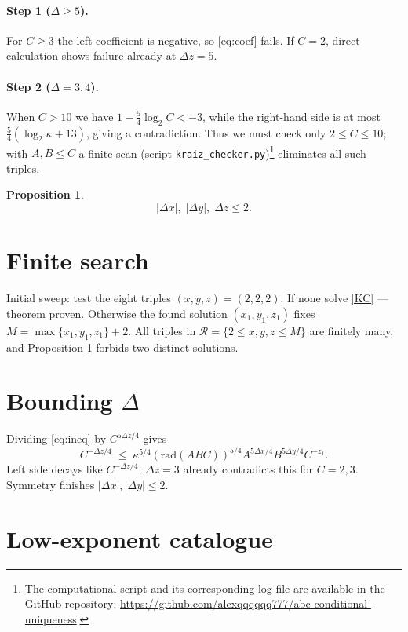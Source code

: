 \documentclass{article}
\newcommand{\rad}{\mathrm{rad}}
\newtheorem{proposition}[theorem]{Proposition}
\begin{document}
\paragraph{Step 1 ($\Delta\ge5$).} For $C\ge3$ the left coefficient is
negative, so \eqref{eq:coef} fails. If $C=2$, direct calculation shows
failure already at $\Delta z=5$.

\paragraph{Step 2 ($\Delta=3,4$).} When $C>10$ we have
$1-\tfrac54\log_{2}C<-3$, while the right-hand side is at most
$\tfrac54(\log_{2}\kappa+13)$, giving a contradiction. Thus we must
check only $2\le C\le10$; with $A,B\le C$ a finite scan (script
\texttt{kraiz\_checker.py})\footnote{The computational script and its corresponding log file are available in the GitHub repository: \url{https://github.com/alexqqqqqq777/abc-conditional-uniqueness}.} eliminates all such triples.
\medskip

\begin{proposition}\label{prop:delta}
\[
\boxed{|\Delta x|,\;|\Delta y|,\;\Delta z\le2.}
\]
\end{proposition}

\section{Finite search}\label{sec:box}

Initial sweep: test the eight triples $(x,y,z)=(2,2,2)$. If none solve
\eqref{KC} --- theorem proven. Otherwise the found solution
$(x_{1},y_{1},z_{1})$ fixes $M=\max\{x_{1},y_{1},z_{1}\}+2$.
All triples in $\mathcal R=\{2\le x,y,z\le M\}$ are finitely many, and
Proposition \ref{prop:delta} forbids two distinct solutions. \qedsymbol

\appendix
\section{\texorpdfstring{Bounding $\Delta$}{Bounding Delta}}\label{app:bound_delta}

Dividing \eqref{eq:ineq} by $C^{5\Delta z/4}$ gives
\[
C^{-\Delta z/4}\;\le\;\kappa^{5/4}(\rad(ABC))^{5/4}
A^{5\Delta x/4}B^{5\Delta y/4}C^{-z_{1}}.
\]
Left side decays like $C^{-\Delta z/4}$; $\Delta z=3$ already
contradicts this for $C=2,3$. Symmetry finishes $|\Delta x|,|\Delta y|\le2$.\qedsymbol

\section{Low-exponent catalogue}\label{app:low_exp_cat}
\end{document}
